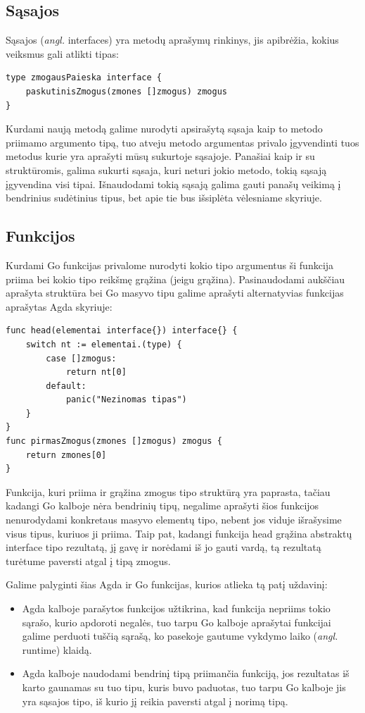 \documentclass{VUMIFPSkursinis}
\begin{document}
\subsection{Sąsajos}
Sąsajos (\textit{angl.} interfaces) yra metodų aprašymų rinkinys, jis apibrėžia, kokius veiksmus gali atlikti tipas:
\begin{lstlisting}[language=GoCust]
type zmogausPaieska interface {
	paskutinisZmogus(zmones []zmogus) zmogus
}
\end{lstlisting}
Kurdami naują metodą galime nurodyti apsirašytą sąsaja kaip to metodo priimamo argumento tipą, tuo atveju metodo argumentas privalo įgyvendinti tuos metodus kurie yra aprašyti mūsų sukurtoje sąsajoje. Panašiai kaip ir su struktūromis, galima sukurti sąsaja, kuri neturi jokio metodo, tokią sąsają įgyvendina visi tipai. Išnaudodami tokią sąsają galima gauti panašų veikimą į bendrinius sudėtinius tipus, bet apie tie bus išsiplėta vėlesniame skyriuje.
\subsection{Funkcijos}
Kurdami Go funkcijas privalome nurodyti kokio tipo argumentus ši funkcija priima bei kokio tipo reikšmę grąžina (jeigu grąžina). Pasinaudodami aukščiau aprašyta struktūra bei Go masyvo tipu galime aprašyti alternatyvias funkcijas aprašytas Agda skyriuje:
\begin{lstlisting}[language=GoCust]
func head(elementai interface{}) interface{} {
	switch nt := elementai.(type) {
		case []zmogus:
			return nt[0]
		default:
			panic("Nezinomas tipas")
	}
}
func pirmasZmogus(zmones []zmogus) zmogus {
	return zmones[0]
}
\end{lstlisting}
Funkcija, kuri priima ir grąžina zmogus tipo struktūrą yra paprasta, tačiau kadangi Go kalboje nėra bendrinių tipų, negalime aprašyti šios funkcijos nenurodydami konkretaus masyvo elementų tipo, nebent jos viduje išrašysime visus tipus, kuriuos ji priima. Taip pat, kadangi funkcija head grąžina abstraktų interface{} tipo rezultatą, jį gavę ir norėdami iš jo gauti vardą, tą rezultatą turėtume paversti atgal į tipą zmogus. \par Galime palyginti šias Agda ir Go funkcijas, kurios atlieka tą patį uždavinį:
\begin{itemize}
	\item Agda kalboje parašytos funkcijos užtikrina, kad funkcija nepriims tokio sąrašo, kurio apdoroti negalės, tuo tarpu Go kalboje aprašytai funkcijai galime perduoti tuščią sąrašą, ko pasekoje gautume vykdymo laiko (\textit{angl.} runtime) klaidą.
	\item Agda kalboje naudodami bendrinį tipą priimančia funkciją, jos rezultatas iš karto gaunamas su tuo tipu, kuris buvo paduotas, tuo tarpu Go kalboje jis yra sąsajos tipo, iš kurio jį reikia paversti atgal į norimą tipą.
\end{itemize}
\end{document}
